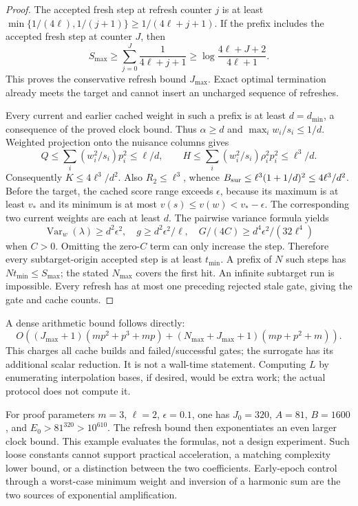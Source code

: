 \documentclass[11pt]{article}
\begin{document}
\begin{proof}
The accepted fresh step at refresh counter $j$ is at least
$\min\{1/(4\ell),1/(j+1)\}\ge1/(4\ell+j+1)$.
If the prefix includes the accepted fresh step at counter $J$, then
\[
 S_{\max}\ge\sum_{j=0}^J\frac1{4\ell+j+1}
 \ge\log\frac{4\ell+J+2}{4\ell+1}.
\]
This proves the conservative refresh bound $J_{\max}$. Exact optimal termination already meets the target and cannot insert an uncharged sequence of refreshes.

Every current and earlier cached weight in such a prefix is at least $d=d_{\min}$, a consequence of the proved clock bound. Thus $\alpha\ge d$ and $\max_i w_i/s_i\le1/d$. Weighted projection onto the nuisance columns gives
\[
 Q\le\sum_i(w_i^2/s_i)p_i^2\le\ell/d,\qquad
 H\le\sum_i(w_i^2/s_i)\rho_i^2p_i^2\le\ell^3/d.
\]
Consequently $K\le4\ell^3/d^2$. Also $R_2\le\ell^3$, whence
$B_{\rm sur}\le\ell^3(1+1/d)^2\le4\ell^3/d^2$.
Before the target, the cached score range exceeds $\epsilon$, because its maximum is at least $v_*$ and its minimum is at most $v(s)\le v(w)<v_*-\epsilon$. The corresponding two current weights are each at least $d$. The pairwise variance formula yields
\[
 \operatorname{Var}_w(\lambda)\ge d^2\epsilon^2,
 \quad g\ge d^2\epsilon^2/\ell,
 \quad G/(4C)\ge d^4\epsilon^2/(32\ell^4)
\]
when $C>0$. Omitting the zero-$C$ term can only increase the step. Therefore every subtarget-origin accepted step is at least $t_{\min}$. A prefix of $N$ such steps has $Nt_{\min}\le S_{\max}$; the stated $N_{\max}$ covers the first hit. An infinite subtarget run is impossible. Every refresh has at most one preceding rejected stale gate, giving the gate and cache counts.
\end{proof}
A dense arithmetic bound follows directly:
\[
 O\!\left((J_{\max}+1)(mp^2+p^3+mp)
 +(N_{\max}+J_{\max}+1)(mp+p^2+m)\right).
\]
This charges all cache builds and failed/successful gates; the surrogate has its additional scalar reduction. It is not a wall-time statement. Computing $L$ by enumerating interpolation bases, if desired, would be extra work; the actual protocol does not compute it.

For proof parameters $m=3$, $\ell=2$, $\epsilon=0.1$, one has $J_0=320$, $A=81$, $B=1600$, and $E_0>81^{320}>10^{610}$. The refresh bound then exponentiates an even larger clock bound. This example evaluates the formulas, not a design experiment. Such loose constants cannot support practical acceleration, a matching complexity lower bound, or a distinction between the two coefficients. Early-epoch control through a worst-case minimum weight and inversion of a harmonic sum are the two sources of exponential amplification.
\end{document}
